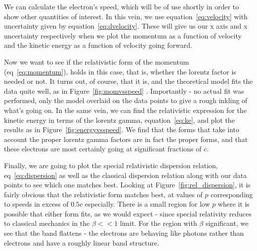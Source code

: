 \documentclass[reprint, nobibnotes, amssymb, amsmath, amsfonts, physics, mathtools, mathrsfs, floatfix]{revtex4-1}
\begin{document}
       We can calculate the electron's speed, which will be of use shortly in order to show other quantities of interest.  In this vein, we use equation~\ref{eq:velocity} with uncertainty given by equation~\ref{eq:dvelocity}.  These will give us our x axis and x uncertainty respectively when we plot the momentum as a function of velocity and the kinetic energy as a function of velocity going forward.

       \hspace{.25cm}

       Now we want to see if the relativistic form of the momentum (eq~\ref{eq:momentum}), holds in this case, that is, whether the lorentz factor is needed or not.  It turns out, of course, that it is, and the theoretical model fits the data quite well, as in Figure~\ref{fig:momvsspeed} .  Importantly - no actual fit was performed, only the model overlaid on the data points to give a rough inkling of what's going on.  In the same vein, we can find the relativistic expression for the kinetic energy in terms of the lorentz gamma, equation~\ref{eq:ke}, and plot the results as in Figure~\ref{fig:energyvsspeed}.  We find that the forms that take into account the proper lorentz gamma factors are in fact the proper forms, and that these electrons are most certainly going at significant fractions of $c$.

       \hspace{.25cm}

       Finally, we are going to plot the special relativistic dispersion relation, eq~\ref{eq:dispersion} as well as the classical dispersion relation along with our data points to see which one matches best.  Looking at Figure~\ref{fig:rel_dispersion}, it is fairly obvious that the relativistic form matches best, at values of $p$ corresponding to speeds in excess of $0.5c$ especially.  There is a small region for low $p$ where it is possible that either form fits, as we would expect - since special relativity reduces to classical mechanics in the $\beta << 1$ limit.  For the region with $\beta$ significant, we see that the band flattens - the electrons are behaving like photons rather than electrons and have a roughly linear band structure.

       \hspace{.25cm}
\end{document}

